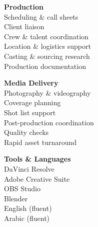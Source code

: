 \documentclass[letterpaper,10pt]{article}
\begin{document}
{\small
\noindent
\begin{minipage}[t]{0.32\textwidth}
  \textbf{Production}\\[2pt]
  Scheduling \& call sheets\\
  Client liaison\\
  Crew \& talent coordination\\
  Location \& logistics support\\
  Casting \& sourcing research\\
  Production documentation
\end{minipage}%
\begin{minipage}[t]{0.32\textwidth}
  \textbf{Media Delivery}\\[2pt]
  Photography \& videography\\
  Coverage planning\\
  Shot list support\\
  Post-production coordination\\
  Quality checks\\
  Rapid asset turnaround
\end{minipage}%
\begin{minipage}[t]{0.32\textwidth}
  \textbf{Tools \& Languages}\\[2pt]
  DaVinci Resolve\\
  Adobe Creative Suite\\
  OBS Studio\\
  Blender\\
  English (fluent)\\
  Arabic (fluent)
\end{minipage}
}
\end{document}
